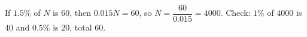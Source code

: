 If $1.5\%$ of $N$ is $60$, then $0.015N=60$, so $N=\dfrac{60}{0.015}=\boxed{4000}$. Check: $1\%$ of $4000$ is $40$ and $0.5\%$ is $20$, total $60$.
